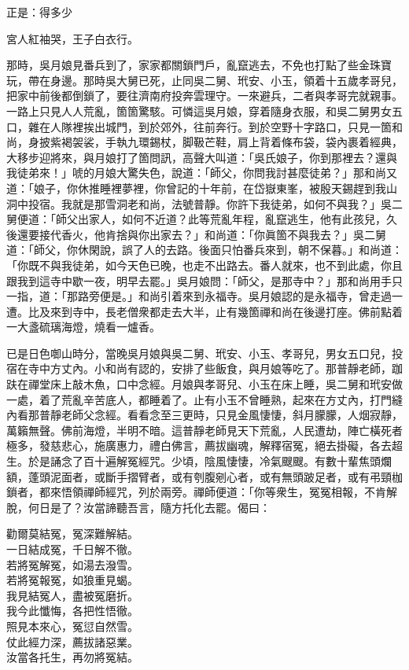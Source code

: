 正是：得多少

\begin{myquote}
宮人紅袖哭，王子白衣行。
\end{myquote}

那時，吳月娘見番兵到了，家家都關鎖門戶，亂竄逃去，不免也打點了些金珠寶玩，帶在身邊。那時吳大舅已死，止同吳二舅、玳安、小玉，領着十五歲孝哥兒，把家中前後都倒鎖了，要往濟南府投奔雲理守。一來避兵，二者與孝哥完就親事。一路上只見人人荒亂，箇箇驚駭。可憐這吳月娘，穿着隨身衣服，和吳二舅男女五口，雜在人隊裡挨出城門，到於郊外，往前奔行。到於空野十字路口，只見一箇和尚，身披紫褐袈裟，手執九環錫杖，脚靸芒鞋，肩上背着條布袋，袋內裹着經典，大移步迎將來，與月娘打了箇問訊，高聲大叫道：「吳氏娘子，你到那裡去？還與我徒弟來！」唬的月娘大驚失色，說道：「師父，你問我討甚麼徒弟？」那和尚又道：「娘子，你休推睡裡夢裡，你曾記的十年前，在岱嶽東峯，被殷天錫趕到我山洞中投宿。我就是那雪洞老和尚，法號普靜。你許下我徒弟，如何不與我？」吳二舅便道：「師父出家人，如何不近道？此等荒亂年程，亂竄逃生，他有此孩兒，久後還要接代香火，他肯捨與你出家去？」和尚道：「你眞箇不與我去？」吳二舅道：「師父，你休閑說，誤了人的去路。後面只怕番兵來到，朝不保暮。」和尚道：「你既不與我徒弟，如今天色已晚，也走不出路去。番人就來，也不到此處，你且跟我到這寺中歇一夜，明早去罷。」吳月娘問：「師父，是那寺中？」那和尚用手只一指，道：「那路旁便是。」和尚引着來到永福寺。吳月娘認的是永福寺，曾走過一遭。比及來到寺中，長老僧衆都走去大半，止有幾箇禪和尚在後邊打座。佛前點着一大盞硫璃海燈，燒看一爐香。

已是日色啣山時分，當晚吳月娘與吳二舅、玳安、小玉、孝哥兒，男女五口兒，投宿在寺中方丈內。小和尚有認的，安排了些飯食，與月娘等吃了。那普靜老師，跏趺在禪堂床上敲木魚，口中念經。月娘與孝哥兒、小玉在床上睡，吳二舅和玳安做一處，着了荒亂辛苦底人，都睡着了。止有小玉不曾睡熟，起來在方丈內，打門縫內看那普靜老師父念經。看看念至三更時，只見金風悽悽，斜月朦朦，人烟寂靜，萬籟無聲。佛前海燈，半明不暗。這普靜老師見天下荒亂，人民遭劫，陣亡橫死者極多，發慈悲心，施廣惠力，禮白佛言，薦拔幽魂，解釋宿冤，絕去掛礙，各去超生。於是誦念了百十遍解冤經咒。少頃，陰風悽悽，冷氣颼颼。有數十輩焦頭爛額，蓬頭泥面者，或斷手摺臂者，或有刳腹剜心者，或有無頭跛足者，或有弔頸枷鎖者，都來悟領禪師經咒，列於兩旁。禪師便道：「你等衆生，冤冤相報，不肯解脫，何日是了？汝當諦聽吾言，隨方托化去罷。偈曰：

\begin{myquote}
勸爾莫結冤，冤深難解結。\\一日結成冤，千日解不徹。\\若將冤解冤，如湯去潑雪。\\若將冤報冤，如狼重見蝎。\\我見結冤人，盡被冤磨折。\\我今此懺悔，各把性悟徹。\\照見本來心，冤愆自然雪。\\仗此經力深，薦拔諸惡業。\\汝當各托生，再勿將冤結。{}
\end{myquote}

